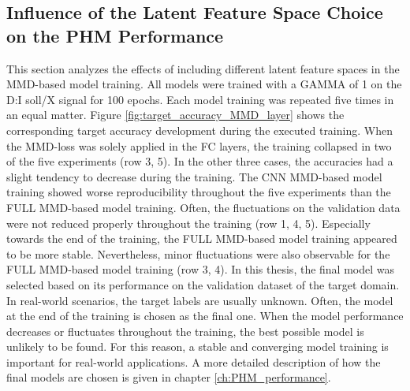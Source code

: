\subsection{Influence of the Latent Feature Space Choice on the PHM Performance}\label{ch:Influence_Layer_real_dataset}
This section analyzes the effects of including different latent feature spaces in the MMD-based model training. All models were trained with a GAMMA of 1 on the D:I soll/X signal for 100 epochs. Each model training was repeated five times in an equal matter. Figure \ref{fig:target_accuracy_MMD_layer} shows the corresponding target accuracy development during the executed training. When the MMD-loss was solely applied in the FC layers, the training collapsed in two of the five experiments (row 3, 5). In the other three cases, the accuracies had a slight tendency to decrease during the training. The CNN MMD-based model training showed worse reproducibility throughout the five experiments than the FULL MMD-based model training. Often, the fluctuations on the validation data were not reduced properly throughout the training (row 1, 4, 5). Especially towards the end of the training, the FULL MMD-based model training appeared to be more stable. Nevertheless, minor fluctuations were also observable for the FULL MMD-based model training (row 3, 4). In this thesis, the final model was selected based on its performance on the validation dataset of the target domain. In real-world scenarios, the target labels are usually unknown. Often, the model at the end of the training is chosen as the final one. When the model performance decreases or fluctuates throughout the training, the best possible model is unlikely to be found. For this reason, a stable and converging model training is important for real-world applications. A more detailed description of how the final models are chosen is given in chapter \ref{ch:PHM_performance}. 


